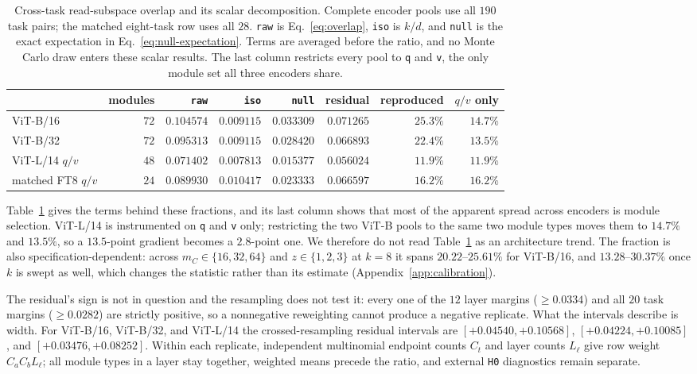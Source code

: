 \begin{table}[h]
\centering
\caption{Cross-task read-subspace overlap and its scalar decomposition. Complete encoder pools use
all $190$ task pairs; the matched eight-task row uses all $28$. \texttt{raw} is
Eq.~\ref{eq:overlap}, \texttt{iso} is $k/d$, and \texttt{null} is the exact expectation in
Eq.~\ref{eq:null-expectation}. Terms are averaged before the ratio, and no Monte Carlo draw enters
these scalar results. The last column restricts every pool to \texttt{q} and \texttt{v}, the only
module set all three encoders share.}
\label{tab:main}
\small
\setlength{\tabcolsep}{4pt}
\begin{tabular}{@{}lrrrrrrr@{}}
\toprule
& modules & \texttt{raw} & \texttt{iso} & \texttt{null} & residual & reproduced & $q/v$ only \\
\midrule
ViT-B/16 & $72$ & $0.104574$ & $0.009115$ & $0.033309$ & $0.071265$ & $25.3\%$ & $14.7\%$ \\
ViT-B/32 & $72$ & $0.095313$ & $0.009115$ & $0.028420$ & $0.066893$ & $22.4\%$ & $13.5\%$ \\
ViT-L/14 $q/v$ & $48$ & $0.071402$ & $0.007813$ & $0.015377$ & $0.056024$ & $11.9\%$ & $11.9\%$ \\
matched FT8 $q/v$ & $24$ & $0.089930$ & $0.010417$ & $0.023333$ & $0.066597$ & $16.2\%$ & $16.2\%$ \\
\bottomrule
\end{tabular}
\end{table}

Table~\ref{tab:main} gives the terms behind these fractions, and its last column shows that most
of the apparent spread across encoders is module selection. ViT-L/14 is instrumented on \texttt{q}
and \texttt{v} only; restricting the two ViT-B pools to the same two module types moves them to
$14.7\%$ and $13.5\%$, so a $13.5$-point gradient becomes a $2.8$-point one. We therefore do not
read Table~\ref{tab:main} as an architecture trend. The fraction is also specification-dependent:
across $m_C\in\{16,32,64\}$ and $z\in\{1,2,3\}$ at $k=8$ it spans $20.22$--$25.61\%$ for ViT-B/16,
and $13.28$--$30.37\%$ once $k$ is swept as well, which changes the statistic rather than its
estimate (Appendix~\ref{app:calibration}).

The residual's sign is not in question and the resampling does not test it: every one of the $12$
layer margins ($\ge 0.0334$) and all $20$ task margins ($\ge 0.0282$) are strictly positive, so a
nonnegative reweighting cannot produce a negative replicate. What the intervals describe is width.
For ViT-B/16, ViT-B/32, and ViT-L/14 the crossed-resampling residual intervals are
$[+0.04540,+0.10568]$, $[+0.04224,+0.10085]$, and $[+0.03476,+0.08252]$. Within each replicate,
independent multinomial endpoint counts $C_t$ and layer counts $L_\ell$ give row weight
$C_aC_bL_\ell$; all module types in a layer stay together, weighted means precede the ratio, and
external \texttt{H0} diagnostics remain separate.

